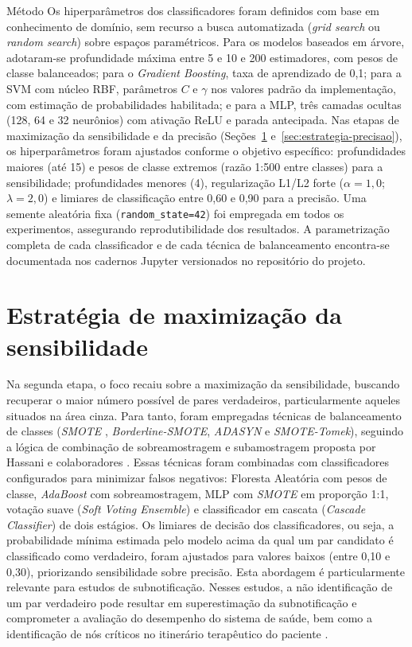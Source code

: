 \begin{chapter}{Método}
Os hiperparâmetros dos classificadores foram definidos com base em conhecimento de domínio, sem recurso a busca automatizada (\textit{grid search} ou \textit{random search}) sobre espaços paramétricos. Para os modelos baseados em árvore, adotaram-se profundidade máxima entre 5 e 10 e 200 estimadores, com pesos de classe balanceados; para o \textit{Gradient Boosting}, taxa de aprendizado de 0,1; para a SVM com núcleo RBF, parâmetros $C$ e $\gamma$ nos valores padrão da implementação, com estimação de probabilidades habilitada; e para a MLP, três camadas ocultas (128, 64 e 32 neurônios) com ativação ReLU e parada antecipada. Nas etapas de maximização da sensibilidade e da precisão (Seções~\ref{sec:estrategia-recall} e~\ref{sec:estrategia-precisao}), os hiperparâmetros foram ajustados conforme o objetivo específico: profundidades maiores (até 15) e pesos de classe extremos (razão 1:500 entre classes) para a sensibilidade; profundidades menores (4), regularização L1/L2 forte ($\alpha = 1{,}0$; $\lambda = 2{,}0$) e limiares de classificação entre 0,60 e 0,90 para a precisão. Uma semente aleatória fixa (\texttt{random\_state=42}) foi empregada em todos os experimentos, assegurando reprodutibilidade dos resultados. A parametrização completa de cada classificador e de cada técnica de balanceamento encontra-se documentada nos cadernos Jupyter versionados no repositório do projeto.

\section{Estratégia de maximização da sensibilidade}\label{sec:estrategia-recall}

Na segunda etapa, o foco recaiu sobre a maximização da sensibilidade, buscando recuperar o maior número possível de pares verdadeiros, particularmente aqueles situados na área cinza. Para tanto, foram empregadas técnicas de balanceamento de classes (\textit{SMOTE} \cite{Chawla2002smote}, \textit{Borderline-SMOTE}, \textit{ADASYN} e \textit{SMOTE-Tomek}), seguindo a lógica de combinação de sobreamostragem e subamostragem proposta por Hassani e colaboradores \citeyearpar{Hassani2025oversampling}. Essas técnicas foram combinadas com classificadores configurados para minimizar falsos negativos: Floresta Aleatória com pesos de classe, \textit{AdaBoost} com sobreamostragem, MLP com \textit{SMOTE} em proporção 1:1, votação suave (\textit{Soft Voting Ensemble}) e classificador em cascata (\textit{Cascade Classifier}) de dois estágios. Os limiares de decisão dos classificadores, ou seja, a probabilidade mínima estimada pelo modelo acima da qual um par candidato é classificado como verdadeiro, foram ajustados para valores baixos (entre 0{,}10 e 0{,}30), priorizando sensibilidade sobre precisão. Esta abordagem é particularmente relevante para estudos de subnotificação. Nesses estudos, a não identificação de um par verdadeiro pode resultar em superestimação da subnotificação e comprometer a avaliação do desempenho do sistema de saúde, bem como a identificação de nós críticos no itinerário terapêutico do paciente \cite{Oliveira2012uso, Sousa2011obitos}.


\end{chapter}
